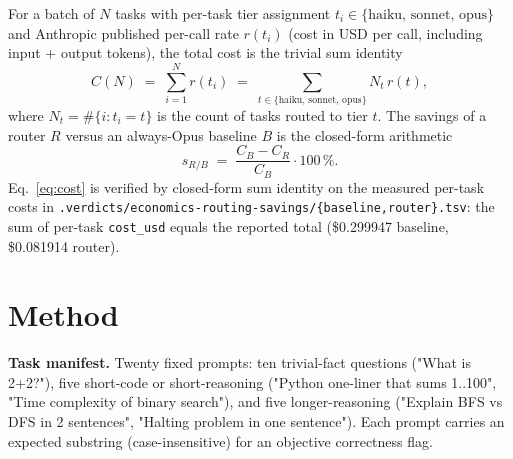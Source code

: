 \documentclass[11pt,a4paper]{article}
\begin{document}
For a batch of $N$ tasks with per-task tier assignment $t_i \in
\{\text{haiku, sonnet, opus}\}$ and Anthropic published per-call rate
$r(t_i)$ (cost in USD per call, including input + output tokens), the
total cost is the trivial sum identity
\begin{equation}
  C(N) \;=\; \sum_{i=1}^{N} r(t_i)
  \;=\; \sum_{t \in \{\text{haiku, sonnet, opus}\}} N_t \, r(t),
  \label{eq:cost}
\end{equation}
where $N_t = \#\{i : t_i = t\}$ is the count of tasks routed to tier
$t$. The savings of a router $R$ versus an always-Opus baseline $B$ is
the closed-form arithmetic
\begin{equation}
  s_{R/B} \;=\; \frac{C_B - C_R}{C_B} \cdot 100\,\%.
  \label{eq:savings}
\end{equation}
Eq.~\ref{eq:cost} is verified by closed-form sum identity on the
measured per-task costs in
\texttt{.verdicts/economics-routing-savings/\{baseline,router\}.tsv}:
the sum of per-task \texttt{cost\_usd} equals the reported total
(\$0.299947 baseline, \$0.081914 router).

\section{Method}
\label{sec:method}

\textbf{Task manifest.} Twenty fixed prompts: ten trivial-fact
questions ("What is 2+2?"), five short-code or short-reasoning
("Python one-liner that sums 1..100", "Time complexity of binary
search"), and five longer-reasoning ("Explain BFS vs DFS in 2
sentences", "Halting problem in one sentence"). Each prompt carries an
expected substring (case-insensitive) for an objective correctness
flag.
\end{document}
